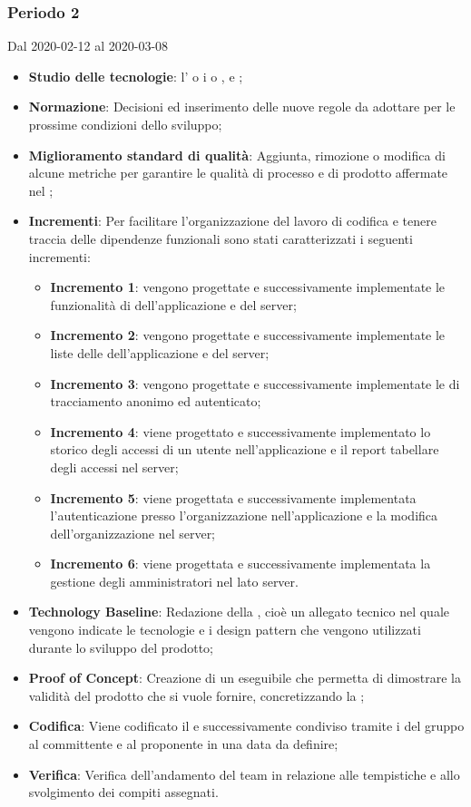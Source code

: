 \subsubsection{Periodo 2} 
Dal 2020-02-12 al 2020-03-08
\begin{itemize}
	\item \textbf{Studio delle tecnologie}: l'  o i   o ,  e ;
	\item \textbf{Normazione}: Decisioni ed inserimento delle nuove regole da adottare per le prossime condizioni dello sviluppo;
	\item \textbf{Miglioramento standard di qualità}: Aggiunta, rimozione o modifica di alcune metriche per garantire le qualità di processo e di prodotto affermate nel \PdQ{};
	\item \textbf{Incrementi}: Per facilitare l'organizzazione del lavoro di codifica e tenere traccia delle dipendenze funzionali sono stati caratterizzati i seguenti incrementi:
		\begin{itemize}
			\item \textbf{Incremento 1}: vengono progettate e successivamente implementate le funzionalità di  dell'applicazione e del server;
			\item \textbf{Incremento 2}: vengono progettate e successivamente implementate le liste delle  dell'applicazione e del server;
			\item \textbf{Incremento 3}: vengono progettate e successivamente implementate le  di tracciamento anonimo ed autenticato;
			\item \textbf{Incremento 4}: viene progettato e successivamente implementato lo storico degli accessi di un utente nell'applicazione e il report tabellare degli accessi nel server;
			\item \textbf{Incremento 5}: viene progettata e successivamente implementata l'autenticazione presso l'organizzazione nell'applicazione e la modifica dell'organizzazione nel server;
			\item \textbf{Incremento 6}: viene progettata e successivamente implementata la gestione degli amministratori nel lato server.
		\end{itemize}
	\item \textbf{Technology Baseline}: Redazione della , cioè un allegato tecnico nel quale vengono indicate le tecnologie e i design pattern che vengono utilizzati durante lo sviluppo del prodotto;
	\item \textbf{Proof of Concept}: Creazione di un eseguibile che permetta di dimostrare la validità del prodotto che si vuole fornire, concretizzando la ;
	\item \textbf{Codifica}: Viene codificato il  e successivamente condiviso tramite i  del gruppo al committente e al proponente in una data da definire;
	\item \textbf{Verifica}: Verifica dell'andamento del team in relazione alle tempistiche e allo svolgimento dei compiti assegnati.
\end{itemize}

